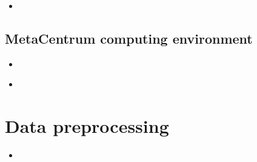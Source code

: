 \documentclass[compress, ucs, xelatex, 11pt, xcolor=x11names, aspectratio=1609,
	hyperref={
		bookmarks=true,
		unicode=true,
		colorlinks=true,
		pdftitle={HybSeq course},
		plainpages=false,
		pdfauthor={Vojtech Zeisek},
		pdfsubject={Practical processing of HybSeq target enrichment sequencing data on computing grids like MetaCentrum},
		pdfcreator={XeLaTeX},
		pdfkeywords={BASH, command line, GNU, HybSeq, Linux, MetaCentrum, sequencing shell, target enrichment},
		linkcolor=Cyan2, %
		anchorcolor=Firebrick2, %
		citecolor=Firebrick2, %
		filecolor=Firebrick2, %
		menucolor=Firebrick2, %
		urlcolor=Chartreuse2, %
		pdftex},
	url={hyphens, lowtilde} %
	]{beamer}
\begin{document}
\begin{frame}[fragile]{}
	\begin{itemize}
		\item 
	\end{itemize}
	\begin{spluscode}
    
	\end{spluscode}
	\begin{bashcode}
    
	\end{bashcode}
\end{frame}

\subsection{MetaCentrum computing environment}

\begin{frame}[fragile]{}
	\begin{itemize}
		\item 
	\end{itemize}
	\begin{spluscode}
    
	\end{spluscode}
	\begin{bashcode}
    
	\end{bashcode}
\end{frame}

\begin{frame}[fragile]{}
	\begin{itemize}
		\item 
	\end{itemize}
	\begin{spluscode}
    
	\end{spluscode}
	\begin{bashcode}
    
	\end{bashcode}
\end{frame}

\section{Data preprocessing}

\begin{frame}[fragile]{}
	\begin{itemize}
		\item 
	\end{itemize}
	\begin{spluscode}
    
	\end{spluscode}
	\begin{bashcode}
    
	\end{bashcode}
\end{frame}
\end{document}
